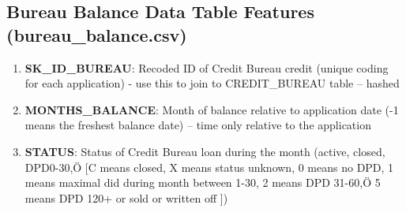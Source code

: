 \documentclass[12pt, letterpaper]{article}
\begin{document}
\begin{appendices}
\subsection{Bureau Balance Data Table Features (bureau_balance.csv)}
\begin{enumerate}
  \item \textbf{SK_ID_BUREAU}: Recoded ID of Credit Bureau credit (unique coding for each application) - use this to join to CREDIT_BUREAU table -- hashed
  \item \textbf{MONTHS_BALANCE}: Month of balance relative to application date (-1 means the freshest balance date) -- time only relative to the application
  \item \textbf{STATUS}: Status of Credit Bureau loan during the month (active, closed, DPD0-30,Ö [C means closed, X means status unknown, 0 means no DPD, 1 means maximal did during month between 1-30, 2 means DPD 31-60,Ö 5 means DPD 120+ or sold or written off ])
\end{enumerate}


\end{appendices}
\end{document}
